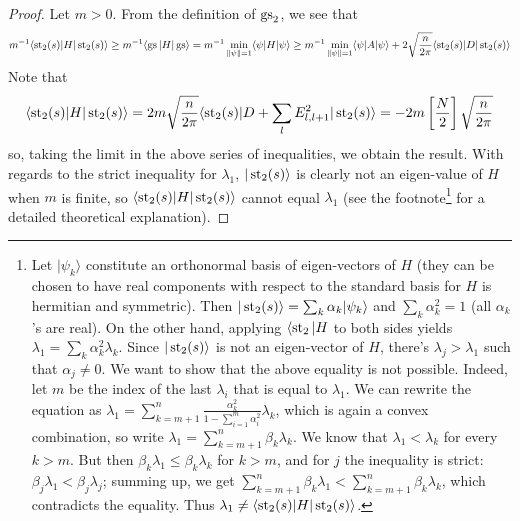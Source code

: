 \begin{proof}
Let $m > 0$. From the definition of $\operatorname{gs}_2$, we see that
\[
m^{-1}\langle \operatorname{st}_2(s) | H| \operatorname{st}_2(s) \rangle \geq m^{-1}\langle \operatorname{gs} | H| \operatorname{gs} \rangle = m^{-1}\min_{\|\psi\|=1} \langle \psi |H|\psi\rangle \geq m^{-1}\min_{\|\psi\|=1} \langle \psi |A |\psi\rangle + 2\sqrt{\frac{n}{2\pi}} \langle \operatorname{st}_2(s) | D| \operatorname{st}_2(s)\rangle 
\]
Note that
\[
\langle \operatorname{st}_2(s) | H|\operatorname{st}_2(s) \rangle = 2m\sqrt{\frac{n}{2\pi}} \langle \operatorname{st}_2(s) | D + \sum_l E_{l,l+1}^2 | \operatorname{st}_2(s)\rangle = -2m\left[\frac{N}{2}\right]\sqrt{\frac{n}{2\pi}}
\]
so, taking the limit in the above series of inequalities, we obtain the result.
With regards to the strict inequality for $\lambda_1$, $|\operatorname{st}_2(s)\rangle$ is clearly not an eigen-value of $H$ when $m$ is finite, so $\langle\operatorname{st}_2(s)|H|\operatorname{st}_2(s)\rangle$ cannot equal $\lambda_1$ (see the footnote\footnote{Let $|\psi_k\rangle$ constitute an orthonormal basis of eigen-vectors of $H$ (they can be chosen to have real components with respect to the standard basis for $H$ is hermitian and symmetric). Then $|\operatorname{st}_2(s)\rangle = \sum_{k} \alpha_k |\psi_k\rangle$ and $\sum_{k}\alpha_k^2 = 1$ (all $\alpha_k$'s are real). On the other hand, applying $\langle \operatorname{st}_2 |H$ to both sides yields $\lambda_1 = \sum_{k} \alpha_k^2 \lambda_k$. Since $|\operatorname{st}_2(s)\rangle$ is not an eigen-vector of $H$, there's $\lambda_j > \lambda_1$ such that $\alpha_j \neq 0$. We want to show that the above equality is not possible. Indeed, let $m$ be the index of the last $\lambda_i$ that is equal to $\lambda_1$. We can rewrite the equation as $\lambda_1 = \sum_{k=m+1}^n \frac{\alpha_k^2}{1-\sum_{i=1}^m \alpha_i^2} \lambda_k$, which is again a convex combination, so write $\lambda_1 = \sum_{k=m+1}^n \beta_k\lambda_k$. We know that $\lambda_1 < \lambda_{k}$ for every $k> m$. But then $\beta_k\lambda_1 \leq \beta_k\lambda_k$ for $k > m$, and for $j$ the inequality is strict: $\beta_j\lambda_1 < \beta_j\lambda_j$; summing up, we get $\sum_{k=m+1}^n \beta_k\lambda_1 < \sum_{k=m+1}^n \beta_k \lambda_k$, which contradicts the equality. Thus $\lambda_1 \neq \langle \operatorname{st}_2(s)|H|\operatorname{st}_2(s)\rangle$.

} for a detailed theoretical explanation).
\end{proof}

